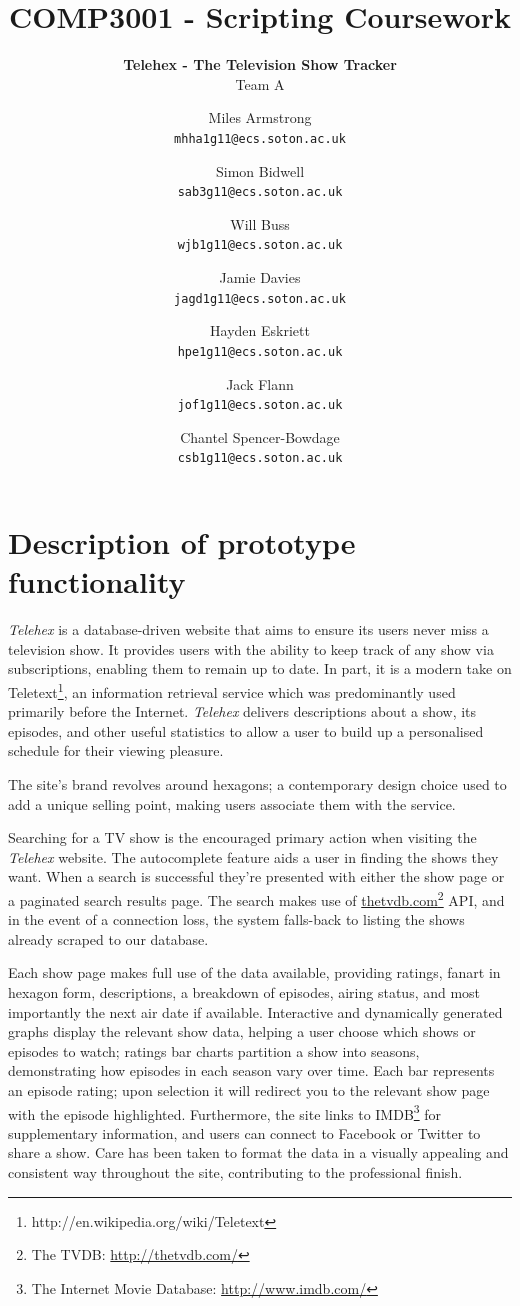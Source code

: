 \documentclass[12pt, a4paper]{article}
\title{\Huge COMP3001 - Scripting Coursework}
\subtitle{\textbf{Telehex - The Television Show Tracker}\\[2em] \Large Team A}
\author{
  Miles Armstrong\\
  \texttt{mhha1g11@ecs.soton.ac.uk}
  \and 
  Simon Bidwell\\
  \texttt{sab3g11@ecs.soton.ac.uk}
  \and 
  Will Buss\\
  \texttt{wjb1g11@ecs.soton.ac.uk}
  \and  
  Jamie Davies\\
  \texttt{jagd1g11@ecs.soton.ac.uk}
  \and  
  Hayden Eskriett\\
  \texttt{hpe1g11@ecs.soton.ac.uk}
  \and
  Jack Flann\\
  \texttt{jof1g11@ecs.soton.ac.uk}
  \and
  Chantel Spencer-Bowdage\\
  \texttt{csb1g11@ecs.soton.ac.uk}\\[2em]
}
\begin{document}
{\color{white}
\clearpage\maketitle
\thispagestyle{empty}
}
\newpage
\section{Description of prototype functionality}

\textit{Telehex} is a database-driven website that aims to ensure its users never miss a television show. It provides users with the ability to keep track of any show via subscriptions, enabling them to remain up to date. In part, it is a modern take on Teletext\footnote{http://en.wikipedia.org/wiki/Teletext}, an information retrieval service which was predominantly used primarily before the Internet. \textit{Telehex} delivers descriptions about a show, its episodes, and other useful statistics to allow a user to build up a personalised schedule for their viewing pleasure. 

The site's brand revolves around hexagons; a contemporary design choice used to add a unique selling point, making users associate them with the service.  

Searching for a TV show is the encouraged primary action when visiting the \textit{Telehex} website. The autocomplete feature aids a user in finding the shows they want. When a search is successful they're presented with either the show page or a paginated search results page. The search makes use of \href{http://thetvdb.com/}{thetvdb.com}\footnote{The TVDB: \href{http://thetvdb.com/}{http://thetvdb.com/}} API, and in the event of a connection loss, the system falls-back to listing the shows already scraped to our database.

Each show page makes full use of the data available, providing ratings, fanart in hexagon form, descriptions, a breakdown of episodes, airing status, and most importantly the next air date if available. Interactive and dynamically generated graphs display the relevant show data, helping a user choose which shows or episodes to watch; ratings bar charts partition a show into seasons, demonstrating how episodes in each season vary over time. Each bar represents an episode rating; upon selection it will redirect you to the relevant show page with the episode highlighted. Furthermore, the site links to IMDB\footnote{The Internet Movie Database: \href{http://www.imdb.com/}{http://www.imdb.com/}} for supplementary information, and users can connect to Facebook or Twitter to share a show. Care has been taken to format the data in a visually appealing and consistent way throughout the site, contributing to the professional finish. 
\end{document}
